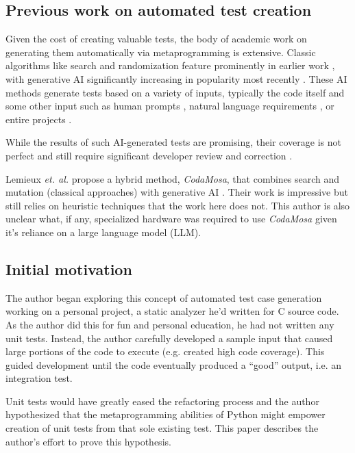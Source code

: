 \subsection{Previous work on automated test creation}\label{sec:intro-3}

Given the cost of creating valuable tests,
the body of academic work on generating them automatically 
via metaprogramming is extensive. Classic algorithms like search 
and randomization feature prominently in earlier work 
\cite{Luk22Pynguin0170}, with generative AI significantly increasing in 
popularity most recently
\cite{bhatia2023unit,takerngsaksiri2024tdd,wang2024software, kahur2023java}.
%
These AI methods generate tests based on a variety of inputs, typically the code
itself and some other input such as human prompts 
\cite{lahiri2023interactivecodegenerationtestdriven},
natural language requirements \cite{wang2024software}, or entire projects
\cite{rao2023cat}.  

While the results of such AI-generated tests are promising,
their coverage is not perfect \cite{kahur2023java} and still require significant
developer review and correction \cite{sundqvist2024ai}.  

Lemieux \textit{et. al.} propose a hybrid method, \textit{CodaMosa}, that 
combines search and mutation (classical approaches) with generative AI
\cite{lemieux2023codamosa}.  Their work is impressive but still relies on 
heuristic techniques that the work here does not. This author is also unclear 
what, if any, specialized hardware was required to use \textit{CodaMosa} given
it's reliance on a large language model (LLM).

\subsection{Initial motivation}\label{sec:intro-4}

The author began exploring this concept of automated test case generation
working on a personal project, a static analyzer he'd written for C source code.  As the
author did this for fun and personal education, he had not written any unit
tests.  Instead, the author carefully developed a sample input that caused large
portions of the code to execute (e.g. created high code coverage).  This guided
development until the code eventually produced a “good” output, i.e. an integration
test.
  
Unit tests would have greatly eased the refactoring process and the author 
hypothesized that the metaprogramming abilities of Python might empower creation
of unit tests from that sole existing test. This paper describes the author's
effort to prove this hypothesis.

